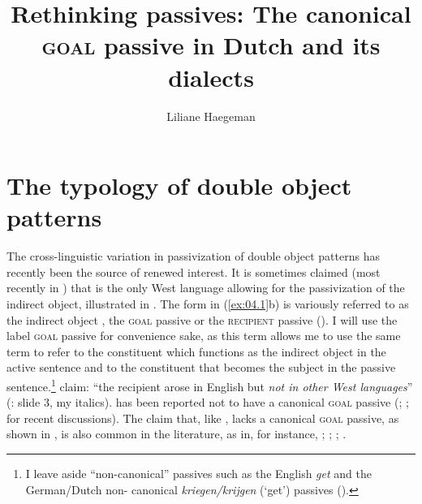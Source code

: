 \documentclass[output=paper]{langsci/langscibook}
\author{Liliane Haegeman\affiliation{Ghent University}}
\title{Rethinking passives: The canonical \textsc{goal} passive in Dutch and 
its dialects}
\begin{document}
\glsresetall

\section{The typology of double object patterns}\label{sec:04.1}

The cross-linguistic variation in passivization of double object patterns has
recently been the source of renewed interest. It
is sometimes claimed (most recently in \citealt{SteinTripsIngham2016}) that
 is the only West  language allowing for the passivization
of the indirect object, illustrated in . The 
form in (\ref{ex:04.1}b) is variously referred to as the indirect object
, the \textsc{goal} passive
\parencite{HaddicanHolmberg2012,HaddicanHolmberg2015}
or the \textsc{recipient} passive (\citealt{SteinTripsIngham2016}). I will use
the label \textsc{goal} passive for convenience sake, as this term allows me to
use the same term to refer to the constituent which functions as the indirect
object in the active sentence and to the constituent that becomes the subject
in the passive sentence.\footnote{I leave aside \enquote{non-canonical}
passives such as the English \emph{get}  and the German/Dutch non-
canonical \emph{kriegen/krijgen} (‘get’) passives (\citealt{AleScha2013}).}
\citeauthor{SteinTripsIngham2016} claim: “the recipient  arose in
English but \emph{not in other West  languages}”
(\citeyear{SteinTripsIngham2016}: slide 3, my italics).  has been
reported not to have a canonical \textsc{goal} passive 
(\citet[70]{Anagnostopoulou2003}; \citet[9]{AleScha2013};
\citet[10]{Aleetal2014} for recent discussions). The claim that, like
,  lacks a canonical \textsc{goal} passive, as shown in
, is also common in the literature, as in, for instance,
\textcite{BroekhuisCornips2004,BroekhuisCornips2012};
\textcite{Broekhuisetal2015}; \citet[8]{AleScha2013};
\textcite[10]{Aleetal2014}.
\end{document}
